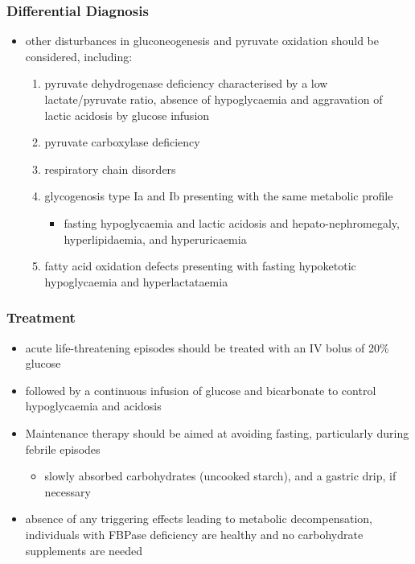 \documentclass{scrartcl}
\begin{document}
\subsubsection{Differential Diagnosis}
\label{sec:org17ee687}
\begin{itemize}
\item other disturbances in gluconeogenesis and pyruvate oxidation should be considered, including:
\begin{enumerate}
\item pyruvate dehydrogenase deficiency characterised by a low
lactate/pyruvate ratio, absence of hypoglycaemia and aggravation
of lactic acidosis by glucose infusion
\item pyruvate carboxylase deficiency
\item respiratory chain disorders
\item glycogenosis type Ia and Ib presenting with the same metabolic profile
\begin{itemize}
\item fasting hypoglycaemia and lactic acidosis and hepato-nephromegaly, hyperlipidaemia, and hyperuricaemia
\end{itemize}
\item fatty acid oxidation defects presenting with fasting hypoketotic hypoglycaemia and hyperlactataemia
\end{enumerate}
\end{itemize}

\subsubsection{Treatment}
\label{sec:orgf33d803}

\begin{itemize}
\item acute life-threatening episodes should be treated with an IV bolus
of 20\% glucose
\item followed by a continuous infusion of glucose and bicarbonate to
control hypoglycaemia and acidosis
\item Maintenance therapy should be aimed at avoiding fasting,
particularly during febrile episodes
\begin{itemize}
\item slowly absorbed carbohydrates (uncooked starch), and a gastric
drip, if necessary
\end{itemize}
\item absence of any triggering effects leading to metabolic
decompensation, individuals with FBPase deficiency are healthy and
no carbohydrate supplements are needed
\end{itemize}
\end{document}

